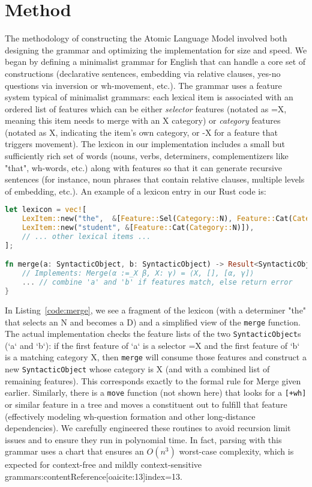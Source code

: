 \documentclass[11pt]{article}
\begin{document}
\section{Method}
\label{sec:method}
The methodology of constructing the Atomic Language Model involved both designing the grammar and optimizing the implementation for size and speed. We began by defining a minimalist grammar for English that can handle a core set of constructions (declarative sentences, embedding via relative clauses, yes-no questions via inversion or wh-movement, etc.). The grammar uses a feature system typical of minimalist grammars: each lexical item is associated with an ordered list of features which can be either \emph{selector} features (notated as =X, meaning this item needs to merge with an X category) or \emph{category} features (notated as X, indicating the item's own category, or -X for a feature that triggers movement). The lexicon in our implementation includes a small but sufficiently rich set of words (nouns, verbs, determiners, complementizers like "that", wh-words, etc.) along with features so that it can generate recursive sentences (for instance, noun phrases that contain relative clauses, multiple levels of embedding, etc.). An example of a lexicon entry in our Rust code is:

\begin{lstlisting}[language=Rust, caption={Snippet of the lexicon and merge function}, label={code:merge}]
let lexicon = vec![
    LexItem::new("the",  &[Feature::Sel(Category::N), Feature::Cat(Category::D)]),
    LexItem::new("student", &[Feature::Cat(Category::N)]),
    // ... other lexical items ...
];

fn merge(a: SyntacticObject, b: SyntacticObject) -> Result<SyntacticObject, DerivationError> {
    // Implements: Merge(α :=_X β, X: γ) = ⟨X, [], [α, γ]⟩
    ... // combine 'a' and 'b' if features match, else return error
}
\end{lstlisting}

In Listing~\ref{code:merge}, we see a fragment of the lexicon (with a determiner "the" that selects an N and becomes a D) and a simplified view of the \texttt{merge} function. The actual implementation checks the feature lists of the two \texttt{SyntacticObject}s (`a` and `b`): if the first feature of `a` is a selector =X and the first feature of `b` is a matching category X, then \texttt{merge} will consume those features and construct a new \texttt{SyntacticObject} whose category is X (and with a combined list of remaining features). This corresponds exactly to the formal rule for Merge given earlier. Similarly, there is a \texttt{move} function (not shown here) that looks for a \texttt{[+wh]} or similar feature in a tree and moves a constituent out to fulfill that feature (effectively modeling wh-question formation and other long-distance dependencies). We carefully engineered these routines to avoid recursion limit issues and to ensure they run in polynomial time. In fact, parsing with this grammar uses a chart that ensures an $O(n^3)$ worst-case complexity, which is expected for context-free and mildly context-sensitive grammars:contentReference[oaicite:13]{index=13}.
\end{document}
